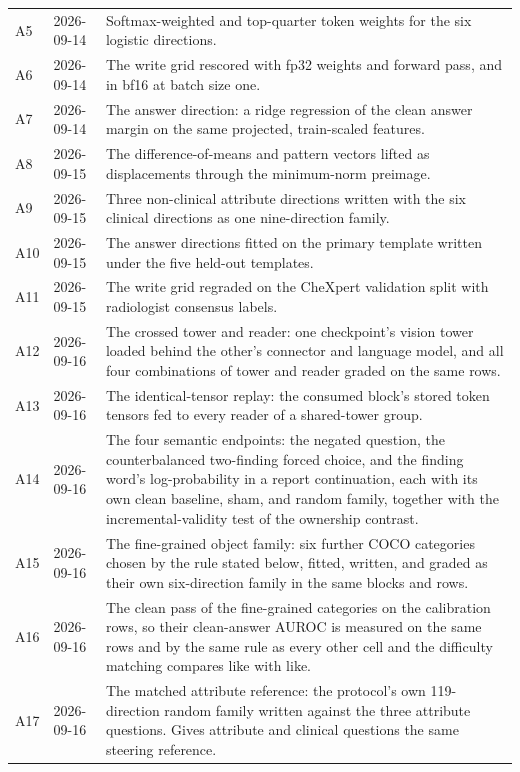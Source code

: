 \documentclass{article}
\begin{document}
\begin{table}[h]
{\begin{tabular}{ll>{\raggedright\arraybackslash}p{}}
A5 & 2026-09-14 & Softmax-weighted and top-quarter token weights for the six logistic directions. \\
A6 & 2026-09-14 & The write grid rescored with fp32 weights and forward pass, and in bf16 at batch size one. \\
A7 & 2026-09-14 & The answer direction: a ridge regression of the clean answer margin on the same projected, train-scaled features. \\
A8 & 2026-09-15 & The difference-of-means and pattern vectors lifted as displacements through the minimum-norm preimage. \\
A9 & 2026-09-15 & Three non-clinical attribute directions written with the six clinical directions as one nine-direction family. \\
A10 & 2026-09-15 & The answer directions fitted on the primary template written under the five held-out templates. \\
A11 & 2026-09-15 & The write grid regraded on the CheXpert validation split with radiologist consensus labels. \\
A12 & 2026-09-16 & The crossed tower and reader: one checkpoint's vision tower loaded behind the other's connector and language model, and all four combinations of tower and reader graded on the same rows. \\
A13 & 2026-09-16 & The identical-tensor replay: the consumed block's stored token tensors fed to every reader of a shared-tower group. \\
A14 & 2026-09-16 & The four semantic endpoints: the negated question, the counterbalanced two-finding forced choice, and the finding word's log-probability in a report continuation, each with its own clean baseline, sham, and random family, together with the incremental-validity test of the ownership contrast. \\
A15 & 2026-09-16 & The fine-grained object family: six further COCO categories chosen by the rule stated below, fitted, written, and graded as their own six-direction family in the same blocks and rows. \\
A16 & 2026-09-16 & The clean pass of the fine-grained categories on the calibration rows, so their clean-answer AUROC is measured on the same rows and by the same rule as every other cell and the difficulty matching compares like with like. \\
A17 & 2026-09-16 & The matched attribute reference: the protocol's own 119-direction random family written against the three attribute questions. Gives attribute and clinical questions the same steering reference. \\

\end{tabular}}
\end{table}
\end{document}

